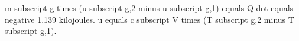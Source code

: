 m subscript g times (u subscript g,2 minus u subscript g,1) equals Q dot equals negative 1.139 kilojoules.  
u equals c subscript V times (T subscript g,2 minus T subscript g,1).